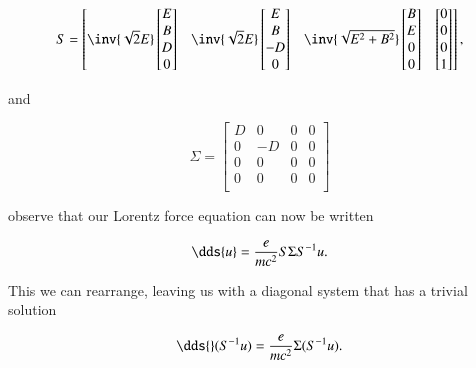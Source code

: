 {\begin{equation}\label{eqn:relElectroDynProblemSet2:710}
S =
\begin{bmatrix}
\inv{\sqrt{2}E}
\begin{bmatrix}
E \\
B \\
D \\
0
\end{bmatrix}
&
\inv{\sqrt{2}E}
\begin{bmatrix}
E \\
B \\
-D \\
0
\end{bmatrix} &
\inv{\sqrt{E^2 + B^2}}
\begin{bmatrix}
B \\
E \\
0 \\
0
\end{bmatrix} &
\begin{bmatrix}
0 \\
0 \\
0 \\
1
\end{bmatrix}
\end{bmatrix},
\end{equation}

and

\begin{equation}\label{eqn:relElectroDynProblemSet2:730}
\Sigma =
\begin{bmatrix}
D & 0 & 0 & 0 \\
0 & -D & 0 & 0 \\
0 & 0 & 0 & 0 \\
0 & 0 & 0 & 0 \\
\end{bmatrix}
\end{equation}

observe that our Lorentz force equation can now be written

\begin{equation}\label{eqn:relElectroDynProblemSet2:750}
\dds{u} = \frac{e}{m c^2} S \Sigma S^{-1} u.
\end{equation}

This we can rearrange, leaving us with a diagonal system that has a trivial solution

\begin{equation}\label{eqn:relElectroDynProblemSet2:770}
\dds{} (S^{-1} u) = \frac{e}{m c^2} \Sigma (S^{-1} u).
\end{equation}

}
